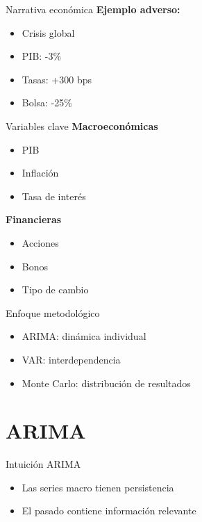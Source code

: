 \documentclass{beamer}
\begin{document}
\begin{frame}{Narrativa económica}
\textbf{Ejemplo adverso:}
\begin{itemize}
\item Crisis global
\item PIB: -3\%
\item Tasas: +300 bps
\item Bolsa: -25\%
\end{itemize}
\end{frame}

\begin{frame}{Variables clave}
\textbf{Macroeconómicas}
\begin{itemize}
\item PIB
\item Inflación
\item Tasa de interés
\end{itemize}

\textbf{Financieras}
\begin{itemize}
\item Acciones
\item Bonos
\item Tipo de cambio
\end{itemize}
\end{frame}

\begin{frame}{Enfoque metodológico}
\begin{itemize}
\item ARIMA: dinámica individual
\item VAR: interdependencia
\item Monte Carlo: distribución de resultados
\end{itemize}
\end{frame}

\section{ARIMA}

\begin{frame}{Intuición ARIMA}
\begin{itemize}
\item Las series macro tienen persistencia
\item El pasado contiene información relevante
\end{itemize}
\end{frame}
\end{document}
